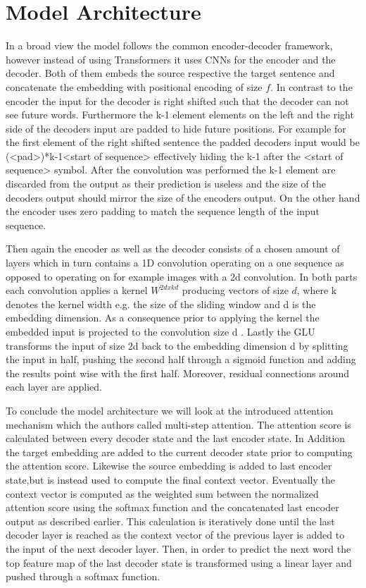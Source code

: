 \documentclass[11pt]{article}
\begin{document}
\section{Model Architecture}
In a broad view the model follows the common encoder-decoder framework, however instead of using Transformers it uses CNNs for the encoder and the decoder. Both of them embeds the source respective the target sentence and concatenate the embedding with positional encoding of size \(f\). In contrast to the encoder the input for the decoder is right shifted such that the decoder can not see future words.
Furthermore the k-1 element  elements on the left and the right side of the decoders input are padded to hide future positions. For example for the first element of the right shifted sentence the padded decoders input would be (<pad>)*k-1<start of sequence> effectively hiding the k-1 after the <start of sequence> symbol. After the convolution was performed the k-1 element are discarded from the output 
as their prediction is useless and the size of the decoders output should mirror the size of the encoders output. On the other hand the encoder uses zero padding to match the sequence  length of the  input sequence.

\noindent Then again the encoder as well as the decoder consists of a chosen amount of layers which in turn contains a 1D convolution operating on a one sequence as opposed to operating on for example images with a 2d convolution. In both parts each convolution applies a kernel \(W^{2d x kd}\) producing vectors of size \(d\), where k denotes the kernel width e.g. the size of the sliding window and d is the embedding dimension. As a consequence  prior to applying the kernel the embedded input  is projected to the convolution size d . Lastly the \ac{GLU} transforms the input of size 2d back to the embedding dimension d by splitting the input in half, pushing the second half through a sigmoid function and adding the results point wise with the first half. Moreover, residual connections around each layer are applied.

\noindent To conclude the model architecture we will look at the introduced attention mechanism which the authors called multi-step attention. The attention score is calculated between every decoder state and the last encoder state. In Addition the target embedding are added to the current decoder state prior to computing the attention score. Likewise the source embedding is added to last encoder state,but is instead  used to compute the final context vector. Eventually the context vector is computed as the weighted sum between the  normalized attention score using the softmax function and the concatenated last encoder output as described earlier. This calculation is iteratively done until the last decoder layer is reached as the context vector of the previous layer is added to the input of the next decoder layer.
Then, in order to predict the next word the top feature map of the last decoder state is transformed using a linear layer and pushed through a softmax function. 
\end{document}
